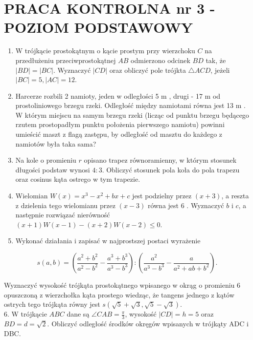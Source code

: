 \documentclass[10pt]{article}
\begin{document}
\section*{PRACA KONTROLNA nr 3 - POZIOM PODSTAWOWY}
\begin{enumerate}
  \item W trójkącie prostokątnym o kącie prostym przy wierzchoku $C$ na przedłużeniu przeciwprostokątnej $A B$ odmierzono odcinek $B D$ tak, że $|B D|=|B C|$. Wyznaczyć $|C D|$ oraz obliczyć pole trójkta $\triangle A C D$, jeżeli $|B C|=5,|A C|=12$.
  \item Harcerze rozbili 2 namioty, jeden w odległości 5 m , drugi - 17 m od prostoliniowego brzegu rzeki. Odległość między namiotami równa jest 13 m . W którym miejscu na samym brzegu rzeki (licząc od punktu brzegu będącego rzutem prostopadłym punktu położenia pierwszego namiotu) powinni umieścić maszt z flagą zastępu, by odległość od masztu do każdego z namiotów była taka sama?
  \item Na kole o promieniu $r$ opisano trapez równoramienny, w którym stosunek długości podstaw wynosi $4: 3$. Obliczyć stosunek pola koła do pola trapezu oraz cosinus kąta ostrego w tym trapezie.
  \item Wielomian $W(x)=x^{3}-x^{2}+b x+c$ jest podzielny przez $(x+3)$, a reszta z dzielenia tego wielomianu przez $(x-3)$ równa jest 6 . Wyznaczyć $b$ i $c$, a następnie rozwiązać nierówność $(x+1) W(x-1)-(x+2) W(x-2) \leqslant 0$.
  \item Wykonać działania i zapisać w najprostszej postaci wyrażenie
\end{enumerate}

$$
s(a, b)=\left(\frac{a^{2}+b^{2}}{a^{2}-b^{2}}-\frac{a^{3}+b^{3}}{a^{3}-b^{3}}\right):\left(\frac{a^{2}}{a^{3}-b^{3}}-\frac{a}{a^{2}+a b+b^{2}}\right) .
$$

Wyznaczyć wysokość trójkąta prostokątnego wpisanego w okrąg o promieniu 6 opuszczoną z wierzchołka kąta prostego wiedząc, że tangens jednego z kątów ostrych tego trójkąta równy jest $s(\sqrt{5}+\sqrt{3}, \sqrt{5}-\sqrt{3})$.\\
6. W trójkącie $A B C$ dane są $\angle C A B=\frac{\pi}{3}$, wysokość $|C D|=h=5$ oraz $B D=d=\sqrt{2}$. Obliczyć odległość środków okręgów wpisanych w trójkąty ADC i DBC.
\end{document}
